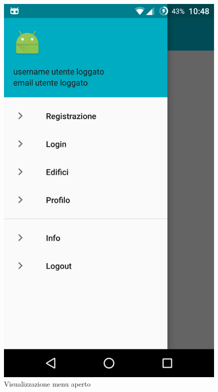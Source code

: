 \documentclass[a4paper,titlepage]{article}
\begin{document}
\begin{figure}[!h]
	\centering
	\includegraphics[scale=0.15]{screenshot/menu}
	\caption{Visualizzazione menu aperto}
\end{figure}







\appendix

\end{document}
